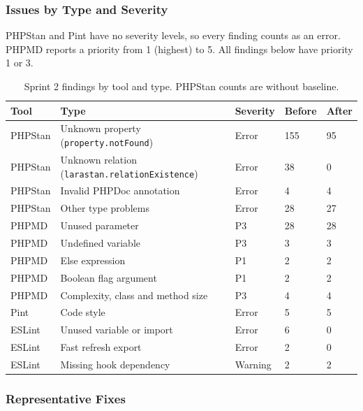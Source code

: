 \subsubsection*{Issues by Type and Severity}

PHPStan and Pint have no severity levels, so every finding counts as an error.
PHPMD reports a priority from 1 (highest) to 5.
All findings below have priority 1 or 3.

\begin{table}[H]
  \centering
  \begin{tabularx}{\linewidth}{L{2.4cm}YL{1.6cm}L{1.4cm}L{1.4cm}}
    \toprule
    Tool & Type & Severity & Before & After \\
    \midrule
    PHPStan & Unknown property (\texttt{property.notFound}) & Error & 155 & 95 \\
    PHPStan & Unknown relation (\texttt{larastan.relationExistence}) & Error & 38 & 0 \\
    PHPStan & Invalid PHPDoc annotation & Error & 4 & 4 \\
    PHPStan & Other type problems & Error & 28 & 27 \\
    PHPMD & Unused parameter & P3 & 28 & 28 \\
    PHPMD & Undefined variable & P3 & 3 & 3 \\
    PHPMD & Else expression & P1 & 2 & 2 \\
    PHPMD & Boolean flag argument & P1 & 2 & 2 \\
    PHPMD & Complexity, class and method size & P3 & 4 & 4 \\
    Pint & Code style & Error & 5 & 5 \\
    ESLint & Unused variable or import & Error & 6 & 0 \\
    ESLint & Fast refresh export & Error & 2 & 0 \\
    ESLint & Missing hook dependency & Warning & 2 & 2 \\
    \bottomrule
  \end{tabularx}
  \caption{Sprint 2 findings by tool and type. PHPStan counts are without baseline.}
  \label{tab:static-sprint2-types}
\end{table}

\subsubsection*{Representative Fixes}

